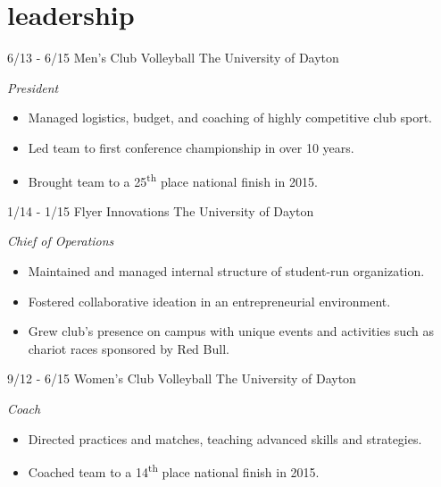 \documentclass[print]{friggeri-cv}
\begin{document}
\begin{entrylist}
\end{entrylist}

\vspace{-10pt} %

\section{leadership}
\begin{entrylist}

\entry
{6/13 - 6/15}
{Men's Club Volleyball}
{The University of Dayton}
{
\emph{President}
\begin{itemize}
	\item Managed logistics, budget, and coaching of highly competitive club sport.
	\item Led team to first conference championship in over 10 years. 
	\item Brought team to a 25\textsuperscript{th} place national finish in 2015.
\end{itemize}
}

\entry
{1/14 - 1/15}
{Flyer Innovations}
{The University of Dayton}
{
\emph{Chief of Operations} 
\begin{itemize}
	\item Maintained and managed internal structure of student-run organization. 
	\item Fostered collaborative ideation in an entrepreneurial environment. 
	\item Grew club's presence on campus with unique events and activities such as chariot races sponsored by Red Bull.
\end{itemize}
}

\entry
{9/12 - 6/15}
{Women's Club Volleyball}
{The University of Dayton}
{
\emph{Coach}
\begin{itemize}
	\item Directed practices and matches, teaching advanced skills and strategies.
	\item Coached team to a 14\textsuperscript{th} place national finish in 2015.
\end{itemize}
}

\end{entrylist}

\end{document}
